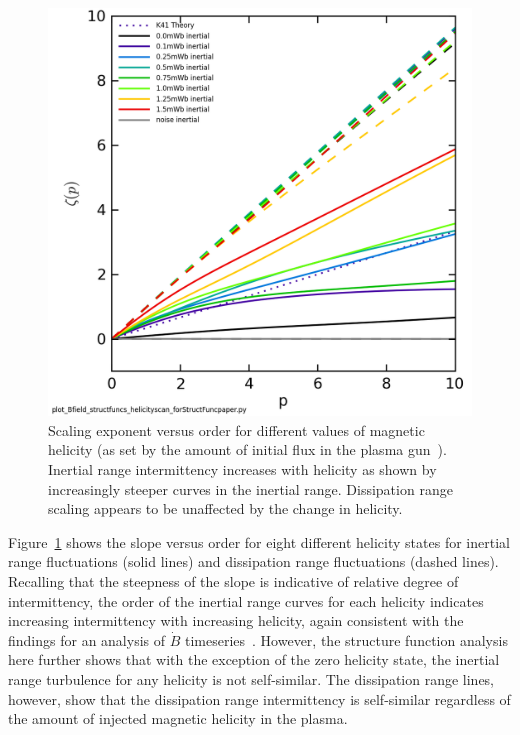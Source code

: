 \documentclass[preprint2]{aastex}
\begin{document}
\begin{figure}
\includegraphics[width={\columnwidth}]{Bmod_StructureFunctionSlope_vs_Moment_helicityscan.png}
\caption{\label{fig:helscan} Scaling exponent versus order for different values of magnetic helicity (as set by the amount of initial flux in the plasma gun~\citep{schaffner2014b}). Inertial range intermittency increases with helicity as shown by increasingly steeper curves in the inertial range. Dissipation range scaling appears to be unaffected by the change in helicity. }
\end{figure}

Figure~\ref{fig:helscan} shows the slope versus order for eight different helicity states for inertial range fluctuations (solid lines) and dissipation range fluctuations (dashed lines). Recalling that the steepness of the slope is indicative of relative degree of intermittency, the order of the inertial range curves for each helicity indicates increasing intermittency with increasing helicity, again consistent with the findings for an analysis of $\dot{B}$ timeseries~\citep{schaffner2014b}. However, the structure function analysis here further shows that with the exception of the zero helicity state, the inertial range turbulence for any helicity is not self-similar. The dissipation range lines, however, show that the dissipation range intermittency is self-similar regardless of the amount of injected magnetic helicity in the plasma.
\end{document}
